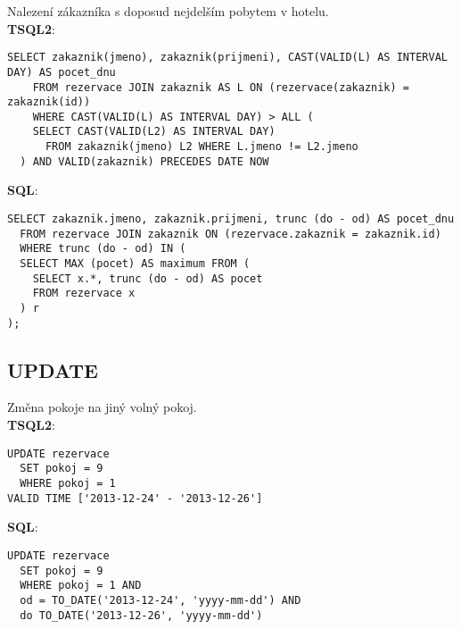 \documentclass[8pt,a4paper]{article}
\begin{document}

Nalezení zákazníka s doposud nejdelším pobytem v hotelu.\\

\textbf{TSQL2}:
\begin{center}
\begin{verbatim}
SELECT zakaznik(jmeno), zakaznik(prijmeni), CAST(VALID(L) AS INTERVAL DAY) AS pocet_dnu
	FROM rezervace JOIN zakaznik AS L ON (rezervace(zakaznik) = zakaznik(id))
	WHERE CAST(VALID(L) AS INTERVAL DAY) > ALL (
    SELECT CAST(VALID(L2) AS INTERVAL DAY)
	  FROM zakaznik(jmeno) L2 WHERE L.jmeno != L2.jmeno
  ) AND VALID(zakaznik) PRECEDES DATE NOW
\end{verbatim}
\end{center}

\textbf{SQL}:
\begin{center}
\begin{verbatim}
SELECT zakaznik.jmeno, zakaznik.prijmeni, trunc (do - od) AS pocet_dnu
  FROM rezervace JOIN zakaznik ON (rezervace.zakaznik = zakaznik.id)
  WHERE trunc (do - od) IN (
  SELECT MAX (pocet) AS maximum FROM (
    SELECT x.*, trunc (do - od) AS pocet 
    FROM rezervace x
  ) r
);
\end{verbatim}
\end{center}


\newpage

\subsection{UPDATE}

Změna pokoje na jiný volný pokoj.\\

\textbf{TSQL2}:
\begin{center}
\begin{verbatim}
UPDATE rezervace
  SET pokoj = 9
  WHERE pokoj = 1
VALID TIME ['2013-12-24' - '2013-12-26']
\end{verbatim}
\end{center}

\textbf{SQL}:
\begin{center}
\begin{verbatim}
UPDATE rezervace
  SET pokoj = 9
  WHERE pokoj = 1 AND
  od = TO_DATE('2013-12-24', 'yyyy-mm-dd') AND
  do TO_DATE('2013-12-26', 'yyyy-mm-dd')
\end{verbatim}
\end{center}
\end{document}
